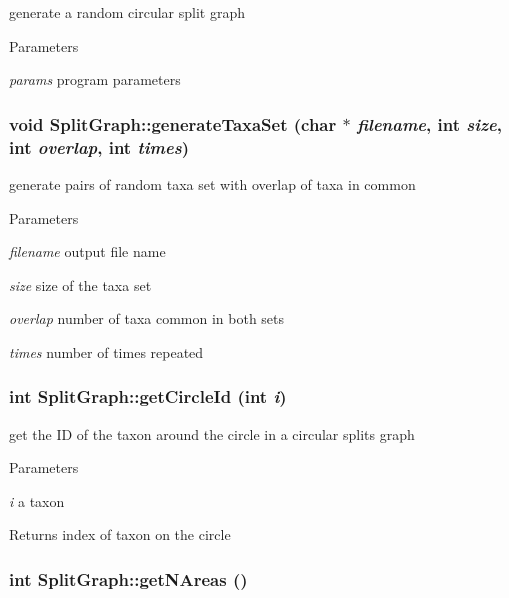 \label{classSplitGraph_a49e61357ca80dc01cc75891c1316a921}
generate a random circular split graph 
\begin{DoxyParams}{Parameters}
\item[{\em params}]program parameters \end{DoxyParams}
\hypertarget{classSplitGraph_aee545f263532bb4d56109fa43455a50a}{
\subsubsection[{generateTaxaSet}]{\setlength{\rightskip}{0pt plus 5cm}void SplitGraph::generateTaxaSet (char $\ast$ {\em filename}, \/  int {\em size}, \/  int {\em overlap}, \/  int {\em times})}}
\label{classSplitGraph_aee545f263532bb4d56109fa43455a50a}
generate pairs of random taxa set with overlap of taxa in common 
\begin{DoxyParams}{Parameters}
\item[{\em filename}]output file name \item[{\em size}]size of the taxa set \item[{\em overlap}]number of taxa common in both sets \item[{\em times}]number of times repeated \end{DoxyParams}
\hypertarget{classSplitGraph_a3c7c98462a61153525cb22439f6872ff}{
\subsubsection[{getCircleId}]{\setlength{\rightskip}{0pt plus 5cm}int SplitGraph::getCircleId (int {\em i})}}
\label{classSplitGraph_a3c7c98462a61153525cb22439f6872ff}
get the ID of the taxon around the circle in a circular splits graph 
\begin{DoxyParams}{Parameters}
\item[{\em i}]a taxon \end{DoxyParams}
\begin{DoxyReturn}{Returns}
index of taxon on the circle 
\end{DoxyReturn}
\hypertarget{classSplitGraph_adfdcee57a677ea807d595328abb28481}{
\subsubsection[{getNAreas}]{\setlength{\rightskip}{0pt plus 5cm}int SplitGraph::getNAreas ()}}
